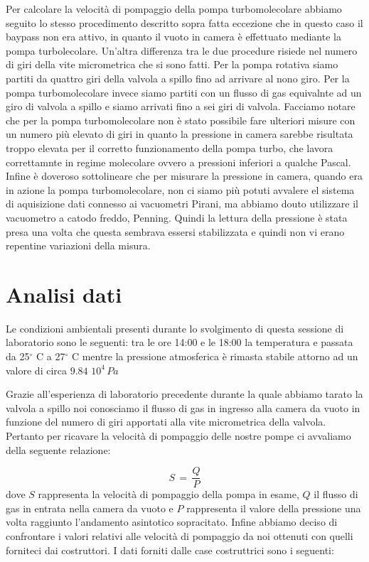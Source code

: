 Per calcolare la velocità di pompaggio della pompa turbomolecolare abbiamo seguito lo stesso procedimento descritto sopra fatta eccezione che in questo caso il baypass non era attivo, in quanto il vuoto in camera è effettuato mediante la pompa turbolecolare.
Un'altra differenza tra le due procedure risiede nel numero di giri della vite micrometrica che si sono fatti. Per la pompa rotativa siamo partiti da quattro giri della valvola a spillo fino ad arrivare al nono giro. Per la pompa turbomolecolare invece siamo partiti con un flusso di gas equivalnte ad un giro di valvola a spillo e siamo arrivati fino a sei giri di valvola. Facciamo notare che per la pompa turbomolecolare non è stato possibile fare ulteriori misure con un numero più elevato di giri in quanto la pressione in camera sarebbe risultata troppo elevata per il corretto funzionamento della pompa turbo, che lavora correttamnte in regime molecolare ovvero a pressioni inferiori a qualche Pascal.
Infine è doveroso sottolineare che per misurare la pressione in camera, quando era in azione la pompa turbomolecolare, non ci siamo più potuti avvalere el sistema di aquisizione dati connesso ai vacuometri Pirani, ma abbiamo douto utilizzare il vacuometro a catodo freddo, Penning. Quindi la lettura della pressione è stata presa una volta che questa sembrava essersi stabilizzata e quindi non vi erano repentine variazioni della misura.  

\section{Analisi dati}

Le condizioni ambientali presenti durante lo svolgimento di questa sessione di laboratorio sono le seguenti: tra le ore 14:00 e le 18:00 la temperatura e passata da 25$^\circ$ C a 27$^\circ$ C mentre la pressione atmosferica è rimasta stabile attorno ad un valore di circa $9.84\,\,10^4\, Pa$

Grazie all'esperienza di laboratorio precedente durante la quale abbiamo tarato la valvola a spillo noi conosciamo il flusso di gas in ingresso alla camera da vuoto in funzione del numero di giri apportati alla vite micrometrica della valvola.
Pertanto per ricavare la velocità di pompaggio delle nostre pompe ci avvaliamo della seguente relazione:

\begin{equation}
	S \,=\, \frac{Q}{P}
\end{equation}
%
dove $S$ rappresenta la velocità di pompaggio della pompa in esame, $Q$ il flusso di gas in entrata nella camera da vuoto e $P$ rappresenta il valore della pressione una volta raggiunto l'andamento asintotico sopracitato. 
%
%
%
%
Infine abbiamo deciso di confrontare i valori relativi alle velocità di pompaggio da noi ottenuti con quelli forniteci dai costruttori. I dati forniti dalle case costruttrici sono i seguenti:
%
%

